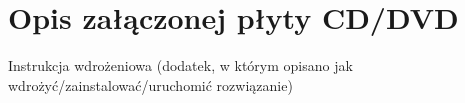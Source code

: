 \chapter{Opis załączonej płyty CD/DVD}
Instrukcja wdrożeniowa (dodatek, w którym opisano jak wdrożyć/zainstalować/uruchomić rozwiązanie)
